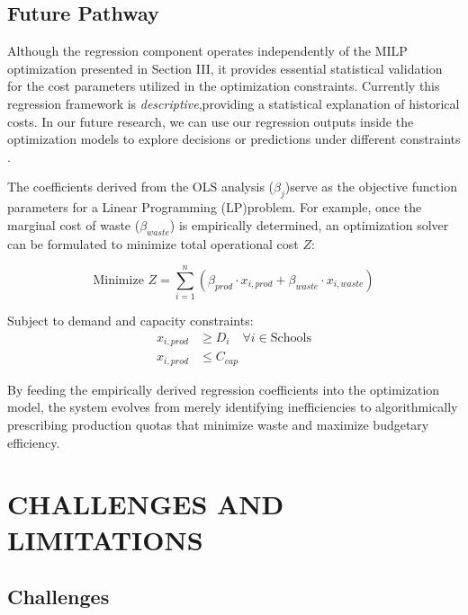 \documentclass[journal]{IEEEtran}
\begin{document}
\subsection{Future Pathway}

Although the regression component operates independently of the MILP optimization presented in Section III, it provides essential statistical validation for the cost parameters utilized in the optimization constraints. Currently this regression framework is \textit{descriptive},providing a statistical explanation of historical costs. In our future research, we can use our regression outputs inside the optimization models to explore decisions or predictions under different constraints \cite{Elmachtoub2017}.

The coefficients derived from the OLS analysis ($\beta_j$)serve as the objective function parameters for a Linear Programming (LP)problem. For example, once the marginal cost of waste ($\beta_{waste}$) is empirically determined, an optimization solver can be formulated to minimize total operational cost $Z$:

\begin{equation}
    \text{Minimize } Z = \sum_{i=1}^{n} (\beta_{prod} \cdot x_{i,prod} + \beta_{waste} \cdot x_{i,waste})
\end{equation}


Subject to demand and capacity constraints:
\begin{align}
    x_{i,prod} &\geq D_{i} \quad \forall i \in \text{Schools} \\
    x_{i,prod} &\leq C_{cap}
\end{align}


By feeding the empirically derived regression coefficients into the optimization model, the system evolves from merely identifying inefficiencies to algorithmically prescribing production quotas that minimize waste and maximize budgetary efficiency.


\section{CHALLENGES AND LIMITATIONS}

\subsection{Challenges}
\end{document}
